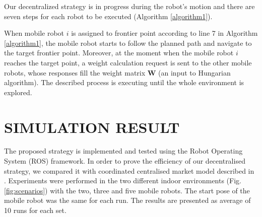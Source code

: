 \documentclass[letterpaper, 10 pt, conference]{ieeeconf}  %
\begin{document}
Our decentralized strategy is in progress during the robot's motion and there are seven steps for each robot to be executed (Algorithm \ref{algorithm1}).    

When mobile robot $i$ is assigned to frontier point according to line 7 in Algorithm \ref{algorithm1}, the mobile robot starts to follow the planned path and navigate to the target frontier point. Moreover, at the moment when the mobile robot $i$ reaches the target point, a weight calculation request is sent to the other mobile robots, whose responses fill the  weight matrix $\boldsymbol{W}$ (an input to Hungarian algorithm). The described process is executing until the whole environment is explored.

\section{SIMULATION RESULT}

The proposed strategy is implemented and tested using the Robot Operating System (ROS) framework. In order to prove the efficiency of our decentralised strategy, we compared it with coordinated centralised market model described in \cite{burgard}. Experiments were performed in the two different indoor environments (Fig. \ref{fig:scenarios}) with the two, three and five mobile robots. The start pose of the mobile robot was the same for each run. The results are presented as average of 10 runs for each set.
\end{document}

